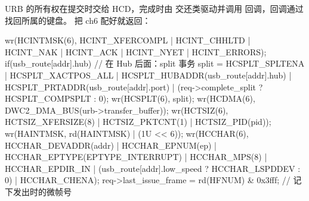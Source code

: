 URB 的所有权在提交时交给 HCD，完成时由  交还类驱动并调用  回调，回调通过  找回所属的键盘。 把 ch6 配好就返回：

\begin{ccode}
wr(HCINTMSK(6), HCINT_XFERCOMPL | HCINT_CHHLTD | HCINT_NAK |
                 HCINT_ACK | HCINT_NYET | HCINT_ERRORS);
if(usb_route[addr].hub)                        // 在 Hub 后面：split 事务
  split = HCSPLT_SPLTENA | HCSPLT_XACTPOS_ALL |
          HCSPLT_HUBADDR(usb_route[addr].hub) | HCSPLT_PRTADDR(usb_route[addr].port) |
          (req->complete_split ? HCSPLT_COMPSPLT : 0);
wr(HCSPLT(6), split);
wr(HCDMA(6),  DWC2_DMA_BUS(urb->transfer_buffer));
wr(HCTSIZ(6), HCTSIZ_XFERSIZE(8) | HCTSIZ_PKTCNT(1) | HCTSIZ_PID(pid));
wr(HAINTMSK, rd(HAINTMSK) | (1U << 6));
wr(HCCHAR(6), HCCHAR_DEVADDR(addr) | HCCHAR_EPNUM(ep) | HCCHAR_EPTYPE(EPTYPE_INTERRUPT) |
              HCCHAR_MPS(8) | HCCHAR_EPDIR_IN |
              (usb_route[addr].low_speed ? HCCHAR_LSPDDEV : 0) | HCCHAR_CHENA);
req->last_issue_frame = rd(HFNUM) & 0x3fff;    // 记下发出时的微帧号
\end{ccode}

